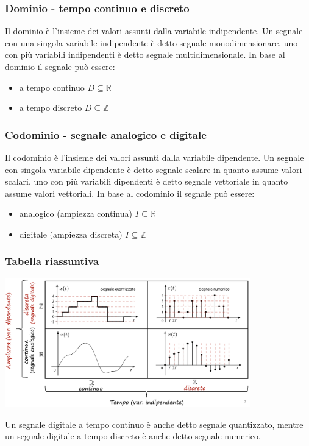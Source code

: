 \documentclass[a4paper]{article}
\begin{document}
\subsubsection*{Dominio - tempo continuo e discreto}
Il dominio è l'insieme dei valori assunti dalla variabile indipendente. Un segnale con una singola variabile indipendente è detto segnale
monodimensionare, uno con più variabili indipendenti è detto segnale multidimensionale. In base al dominio il segnale può essere:
\begin{itemize}
	\item a tempo continuo \(D \subseteq \mathbb{R}\)
	\item a tempo discreto \(D \subseteq \mathbb{Z}\)
\end{itemize}


\subsubsection*{Codominio - segnale analogico e digitale}
Il codominio è l'insieme dei valori assunti dalla variabile dipendente. Un segnale con singola variabile dipendente è detto segnale
scalare in quanto assume valori scalari, uno con più variabili dipendenti è detto segnale vettoriale in quanto assume valori vettoriali.
In base al codominio il segnale può essere:
\begin{itemize}
	\item analogico (ampiezza continua) \(I \subseteq \mathbb{R}\)
	\item digitale (ampiezza discreta) \(I \subseteq \mathbb{Z}\)
\end{itemize}

\subsubsection*{Tabella riassuntiva}
\begin{center}
	\includegraphics[width=0.8\textwidth]{classificazione segnali.png}
\end{center}
Un segnale digitale a tempo continuo è anche detto segnale quantizzato, mentre un segnale digitale a tempo discreto è anche detto
segnale numerico.
\end{document}
